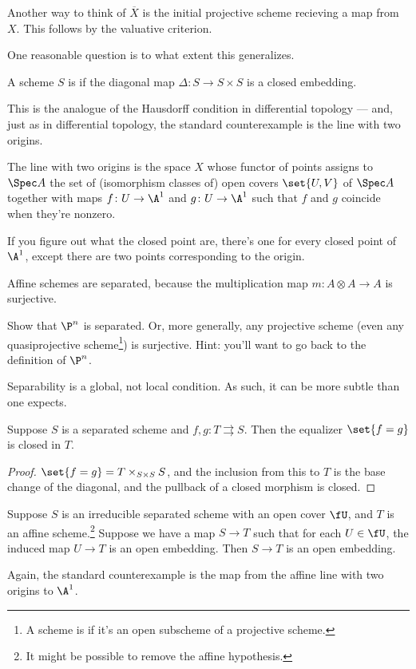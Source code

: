 \begin{rem}
Another way to think of $\overline X$ is the initial projective scheme recieving a map from $X$. This follows by
the valuative criterion.
\end{rem}
One reasonable question is to what extent this generalizes.
\begin{defn}
A scheme $S$ is  if the diagonal map $\Delta\colon S\to S\times S$ is a closed embedding.
\end{defn}
This is the analogue of the Hausdorff condition in differential topology --- and, just as in differential topology,
the standard counterexample is the line with two origins.
\begin{exm}
The line with two origins is the space $X$ whose functor of points assigns to $\Spec A$ the set of (isomorphism
classes of) open covers $\set{U,V}$ of $\Spec A$ together with maps $f\colon U\to\A^1$ and $g\colon U\to\A^1$ such
that $f$ and $g$ coincide when they're nonzero.

If you figure out what the closed point are, there's one for every closed point of $\A^1$, except there are two
points corresponding to the origin.
\end{exm}
Affine schemes are separated, because the multiplication map $m\colon A\otimes A\to A$ is surjective.
\begin{exm}
Show that $\P^n$ is separated. Or, more generally, any projective scheme (even any quasiprojective
scheme\footnote{A scheme is  if it's an open subscheme of a projective scheme.}) is
surjective. Hint: you'll want to go back to the definition of $\P^n$.
\end{exm}
Separability is a global, not local condition. As such, it can be more subtle than one expects.
\begin{lem}
Suppose $S$ is a separated scheme and $f,g\colon T\rightrightarrows S$. Then the equalizer $\set{f = g}$ is closed
in $T$.
\end{lem}
\begin{proof}
$\set{f = g} = T\times_{S\times S} S$, and the inclusion from this to $T$ is the base change of the diagonal, and
the pullback of a closed morphism is closed.
\end{proof}
\begin{cor}
\label{sepopen}
Suppose $S$ is an irreducible separated scheme with an open cover $\fU$, and $T$ is an affine scheme.\footnote{It might
be possible to remove the affine hypothesis.} Suppose we have a map $S\to T$ such that for each $U\in\fU$, the
induced map $U\to T$ is an open embedding. Then $S\to T$ is an open embedding.
\end{cor}
Again, the standard counterexample is the map from the affine line with two origins to $\A^1$.

